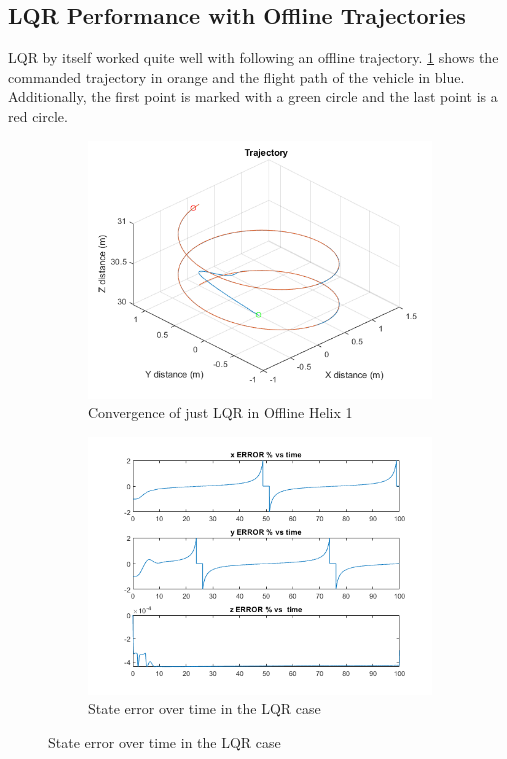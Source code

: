 \documentclass[conf]{new-aiaa}
\begin{document}
\begin{doublespace}
\begin{singlespace}
\subsection{LQR Performance with Offline Trajectories}
LQR by itself worked quite well with following an offline trajectory. \ref{LQR} shows the commanded trajectory in orange and the flight path of the vehicle in blue. Additionally, the first point is marked with a green circle and the last point is a red circle.
\begin{figure}[!htpb]
\begin{subfigure}{.5\textwidth}
  \centering
	\includegraphics[scale= 0.5]{LQR.png}
	\caption{Convergence of just LQR in Offline Helix 1}
	\label{LQR}
\end{subfigure}%
\begin{subfigure}{.5\textwidth}
  	\centering
  \includegraphics[scale= 0.65]{LQRerror.png}
  \caption{State error over time in the LQR case}
  \label{LQR_error}
\end{subfigure}%
\end{figure}




\end{singlespace}
\end{doublespace}
\end{document}
